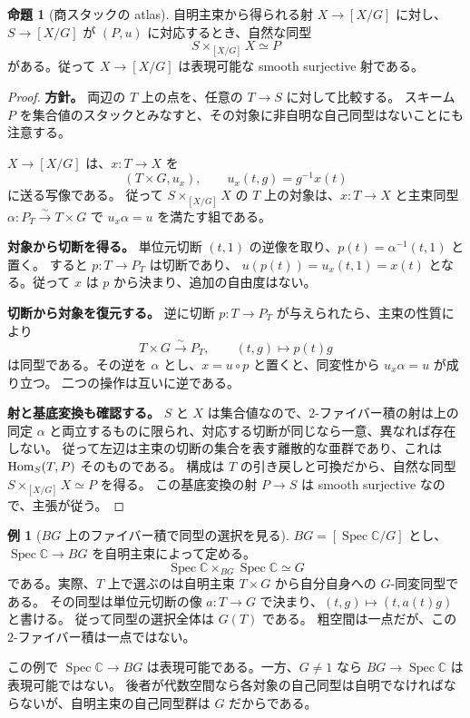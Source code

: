 \documentclass[dvipdfmx,a4paper,11pt]{article}
\theoremstyle{definition}
\newtheorem{prop}[thm]{命題}
\newtheorem{exa}[thm]{例}
\newcommand{\C}{\mathbb C}\newcommand{\R}{\mathbb R}\newcommand{\Z}{\mathbb Z}\newcommand{\Q}{\mathbb Q}
\DeclareMathOperator{\Spec}{Spec}\DeclareMathOperator{\Proj}{Proj}\DeclareMathOperator{\GL}{GL}
\begin{document}
\begin{prop}[商スタックの atlas]\label{prop:atlas}
自明主束から得られる射 $X\to[X/G]$ に対し、$S\to[X/G]$ が $(P,u)$ に対応するとき、自然な同型
\[
S\times_{[X/G]}X\simeq P
\]
がある。従って $X\to[X/G]$ は表現可能な smooth surjective 射である。
\end{prop}
\begin{proof}
\textbf{方針。} 両辺の $T$ 上の点を、任意の $T\to S$ に対して比較する。
スキーム $P$ を集合値のスタックとみなすと、その対象に非自明な自己同型はないことにも注意する。

$X\to[X/G]$ は、$x:T\to X$ を
\[
(T\times G,u_x),\qquad u_x(t,g)=g^{-1}x(t)
\]
に送る写像である。
従って $S\times_{[X/G]}X$ の $T$ 上の対象は、$x:T\to X$ と主束同型
$\alpha:P_T\xrightarrow{\sim}T\times G$ で $u_x\alpha=u$ を満たす組である。

\textbf{対象から切断を得る。}
単位元切断 $(t,1)$ の逆像を取り、$p(t)=\alpha^{-1}(t,1)$ と置く。
すると $p:T\to P_T$ は切断であり、
$u(p(t))=u_x(t,1)=x(t)$ となる。従って $x$ は $p$ から決まり、追加の自由度はない。

\textbf{切断から対象を復元する。}
逆に切断 $p:T\to P_T$ が与えられたら、主束の性質により
\[
T\times G\xrightarrow{\sim}P_T,\qquad(t,g)\longmapsto p(t)g
\]
は同型である。その逆を $\alpha$ とし、$x=u\circ p$ と置くと、同変性から $u_x\alpha=u$ が成り立つ。
二つの操作は互いに逆である。

\textbf{射と基底変換も確認する。}
$S$ と $X$ は集合値なので、$2$-ファイバー積の射は上の同定 $\alpha$ と両立するものに限られ、対応する切断が同じなら一意、異なれば存在しない。
従って左辺は主束の切断の集合を表す離散的な亜群であり、これは $\operatorname{Hom}_S(T,P)$ そのものである。
構成は $T$ の引き戻しと可換だから、自然な同型 $S\times_{[X/G]}X\simeq P$ を得る。
この基底変換の射 $P\to S$ は smooth surjective なので、主張が従う。
\end{proof}
\begin{exa}[$BG$ 上のファイバー積で同型の選択を見る]
$BG=[\Spec\C/G]$ とし、$\Spec\C\to BG$ を自明主束によって定める。
\[
\Spec\C\times_{BG}\Spec\C\simeq G
\]
である。実際、$T$ 上で選ぶのは自明主束 $T\times G$ から自分自身への $G$-同変同型である。
その同型は単位元切断の像 $a:T\to G$ で決まり、$(t,g)\mapsto(t,a(t)g)$ と書ける。
従って同型の選択全体は $G(T)$ である。
粗空間は一点だが、この $2$-ファイバー積は一点ではない。

この例で $\Spec\C\to BG$ は表現可能である。一方、$G\neq1$ なら $BG\to\Spec\C$ は表現可能ではない。
後者が代数空間なら各対象の自己同型は自明でなければならないが、自明主束の自己同型群は $G$ だからである。
\end{exa}
\end{document}
